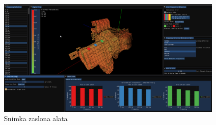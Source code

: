 \documentclass[times, utf8, diplomski]{fer}
\begin{document}
\begin{figure}[H]
\centering
\includegraphics[width=\linewidth]{general_screenshot.png}
\caption{Snimka zaslona alata}
\label{fig:gen-screen}
\end{figure}
\end{document}
